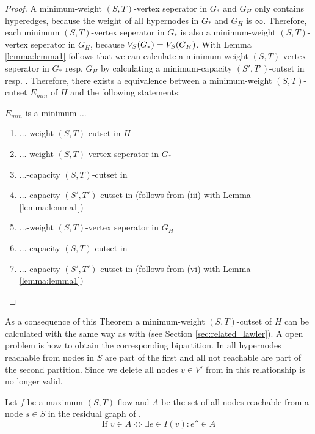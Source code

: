 \begin{proof}
A minimum-weight $(S,T)$-vertex seperator in $G_*$ and $G_H$ only contains hyperedges, because
the weight of all hypernodes in $G_*$ and $G_H$ is $\infty$. Therefore, each minimum
$(S,T)$-vertex seperator in $G_*$ is also a minimum-weight $(S,T)$-vertex seperator in $G_H$,
because $V_S(G_*) = V_S(G_H)$. With Lemma \ref{lemma:lemma1} follows that we can calculate
a minimum-weight $(S,T)$-vertex seperator in $G_*$ resp. $G_H$ by calculating a minimum-capacity
$(S',T')$-cutset in  resp. . Therefore, there exists a equivalence
between a minimum-weight $(S,T)$-cutset $E_{min}$ of $H$ and the following statements: 

$E_{min}$ is a minimum-$\ldots$
\begin{enumerate}
\item $\ldots$-weight $(S,T)$-cutset in $H$
\item $\ldots$-weight $(S,T)$-vertex seperator in $G_*$
\item $\ldots$-capacity $(S,T)$-cutset in 
\item $\ldots$-capacity $(S',T')$-cutset in  (follows from (iii) with Lemma \ref{lemma:lemma1})
\item $\ldots$-weight $(S,T)$-vertex seperator in $G_H$
\item $\ldots$-capacity $(S,T)$-cutset in 
\item $\ldots$-capacity $(S',T')$-cutset in  (follows from (vi) with Lemma \ref{lemma:lemma1})
\end{enumerate}

\end{proof}

As a consequence of this Theorem a minimum-weight $(S,T)$-cutset of $H$ can be calculated with
 the same way as with  (see Section \ref{sec:related_lawler}). A open
problem is how to obtain the corresponding bipartition. In  all hypernodes
reachable from nodes in $S$ are part of the first and all not reachable are part of the
second partition. Since we delete all nodes $v \in V'$ from  in  this
relationship is no longer valid. 

\begin{lemma}
\label{lemma:bipartition_construction}
Let $f$ be a maximum $(S,T)$-flow and $A$ be the set of all nodes reachable
from a node $s \in S$ in the residual graph of .
\[ \text{If } v \in A \Leftrightarrow \exists e \in I(v): e'' \in A \]
\end{lemma}

